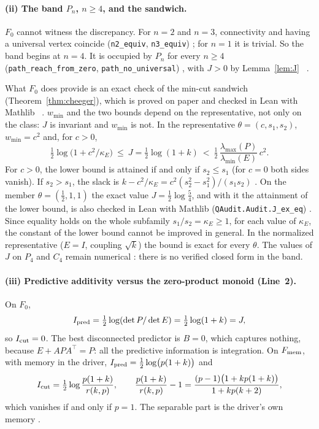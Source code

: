 \paragraph{(ii) The band $P_n$, $n\ge4$, and the sandwich.} $F_0$ cannot witness the discrepancy. For $n=2$ and $n=3$, connectivity and having a universal vertex coincide (\texttt{n2\_equiv}, \texttt{n3\_equiv}) \stL; for $n=1$ it is trivial. So the band begins at $n=4$. It is occupied by $P_n$ for every $n\ge4$ (\texttt{path\_reach\_from\_zero}, \texttt{path\_no\_universal}) \stL, with $J>0$ by Lemma~\ref{lem:J} \stA\ \stM.

What $F_0$ does provide is an exact check of the min-cut sandwich (Theorem~\ref{thm:cheeger}), which is proved on paper and checked in Lean with Mathlib \stA\ \stM. $w_{\min}$ and the two bounds depend on the representative, not only on the class: $J$ is invariant and $w_{\min}$ is not. In the representative $\theta=(c,s_1,s_2)$, $w_{\min}=c^2$ and, for $c>0$,
\begin{equation}
\tfrac12\log\bigl(1+c^2/\kappa_E\bigr)\ \le\ J=\tfrac12\log(1+k)\ <\ \tfrac12\,\frac{\lambda_{\max}(P)}{\lambda_{\min}(E)}\,c^2 .
\end{equation}
For $c>0$, the lower bound is attained if and only if $s_2\le s_1$ (for $c=0$ both sides vanish). If $s_2>s_1$, the slack is $k-c^2/\kappa_E=c^2(s_2^2-s_1^2)/(s_1s_2)$ \stS. On the member $\theta=(\tfrac12,1,1)$ the exact value $J=\tfrac12\log\tfrac54$, and with it the attainment of the lower bound, is also checked in Lean with Mathlib (\texttt{QAudit.Audit.J\_ex\_eq}) \stM. Since equality holds on the whole subfamily $s_1/s_2=\kappa_E\ge1$, for each value of $\kappa_E$, the constant of the lower bound cannot be improved in general. In the normalized representative ($E=I$, coupling $\sqrt k$) the bound is exact for every $\theta$. The values of $J$ on $P_4$ and $C_4$ remain numerical \stN: there is no verified closed form in the band.

\paragraph{(iii) Predictive additivity versus the zero-product monoid (Line~2).} On $F_0$,
\begin{equation}
I_{\rm pred}=\tfrac12\log(\det P/\det E)=\tfrac12\log(1+k)=J,
\end{equation}
so $I_{\rm cut}=0$. The best disconnected predictor is $B=0$, which captures nothing, because $E+APA^\top=P$: all the predictive information is integration. On $F_{\rm mem}$, with memory in the driver, $I_{\rm pred}=\tfrac12\log\bigl(p(1+k)\bigr)$ and
\begin{equation}
I_{\rm cut}=\tfrac12\log\frac{p(1+k)}{r(k,p)},\qquad \frac{p(1+k)}{r(k,p)}-1=\frac{(p-1)\bigl(1+kp(1+k)\bigr)}{1+kp(k+2)} ,
\end{equation}
which vanishes if and only if $p=1$. The separable part is the driver's own memory \stS.

